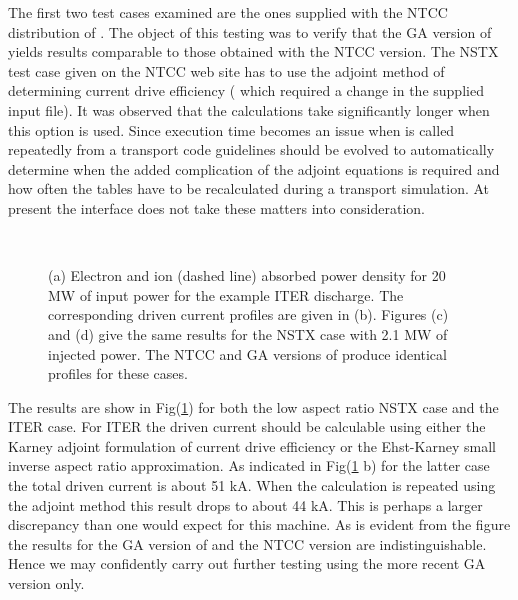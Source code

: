  The first two test cases examined are the ones supplied with the
 NTCC distribution of \ct. The object of this testing was to verify
 that the GA version of \ct yields results comparable to those
 obtained with the NTCC version. The NSTX test case given on the 
 NTCC web site 
\cite{b2}
 has to use  the adjoint method of determining current drive
 efficiency  ( which required a change in the supplied input file).
 It was observed that 
 the calculations take significantly longer when this option is used.
 Since execution  time becomes an 
 issue when \ct is called repeatedly from  a transport code
 guidelines should be evolved to automatically determine when
 the added complication of the adjoint equations is required and how
 often the tables have to be recalculated during a transport
 simulation. At present the \ot interface does not take these matters
 into consideration.
 \begin{figure}[hbt] %
 \centering    
\begin{narrow}{-.50in}{0in}  
 \mbox{}
    \\[20pt]
 \mbox{}
 \end{narrow}
 \caption{ (a) Electron and ion (dashed line)  absorbed power density for 20 MW of input
  power for the example ITER discharge. The corresponding driven current profiles are
  given in (b). Figures (c) and (d) give the same results for the NSTX
  case with 2.1 MW of injected power. The NTCC  and GA versions of
  \ct produce identical profiles for these cases. } 
  \label{Figbwav1a} 
 \end{figure}
 
 The results are show in Fig(\ref{Figbwav1a}) for both the low aspect
 ratio NSTX case and the ITER case.  For ITER  the driven current
 should be calculable using  either the Karney adjoint
 formulation of current drive efficiency or the Ehst-Karney small inverse
 aspect ratio approximation. As indicated in
 Fig(\ref{Figbwav1a} b) for the latter case the total driven current
 is about 51 kA. When the calculation is repeated using the adjoint
 method this result drops to about 44 kA. This is perhaps a larger
 discrepancy than  one would expect for this machine.  As is evident from the
 figure  the results for the GA version of \ct and the
 NTCC version are indistinguishable. Hence we may confidently carry
 out further testing  using the more recent GA version only.

